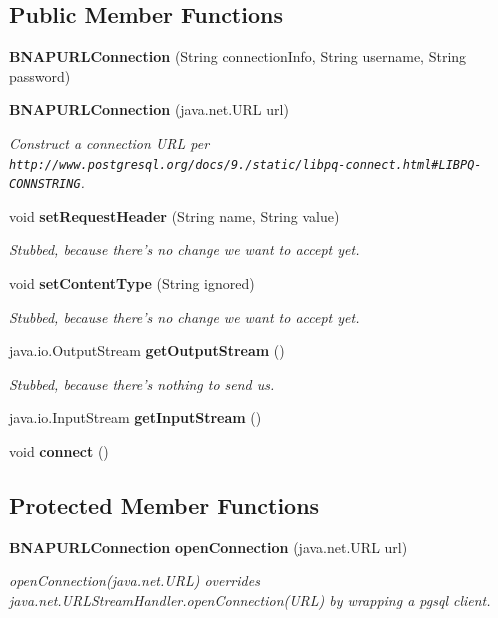 \subsection*{Public Member Functions}
\begin{DoxyCompactItemize}
\item 
{\bf B\+N\+A\+P\+U\+R\+L\+Connection} (String connection\+Info, String username, String password)
\item 
{\bf B\+N\+A\+P\+U\+R\+L\+Connection} (java.\+net.\+U\+R\+L url)
\begin{DoxyCompactList}\small\item\em Construct a connection U\+R\+L per {\tt http\+://www.\+postgresql.\+org/docs/9./static/libpq-\/connect.\+html\#\+L\+I\+B\+P\+Q-\/\+C\+O\+N\+N\+S\+T\+R\+I\+N\+G}. \end{DoxyCompactList}\item 
void {\bf set\+Request\+Header} (String name, String value)
\begin{DoxyCompactList}\small\item\em Stubbed, because there's no change we want to accept yet. \end{DoxyCompactList}\item 
void {\bf set\+Content\+Type} (String ignored)
\begin{DoxyCompactList}\small\item\em Stubbed, because there's no change we want to accept yet. \end{DoxyCompactList}\item 
java.\+io.\+Output\+Stream {\bf get\+Output\+Stream} ()
\begin{DoxyCompactList}\small\item\em Stubbed, because there's nothing to send us. \end{DoxyCompactList}\item 
java.\+io.\+Input\+Stream {\bf get\+Input\+Stream} ()
\item 
void {\bf connect} ()
\end{DoxyCompactItemize}
\subsection*{Protected Member Functions}
\begin{DoxyCompactItemize}
\item 
{\bf B\+N\+A\+P\+U\+R\+L\+Connection} {\bf open\+Connection} (java.\+net.\+U\+R\+L url)
\begin{DoxyCompactList}\small\item\em open\+Connection(java.\+net.\+U\+R\+L) overrides java.\+net.\+U\+R\+L\+Stream\+Handler.\+open\+Connection(\+U\+R\+L) by wrapping a pgsql client. \end{DoxyCompactList}\end{DoxyCompactItemize}


